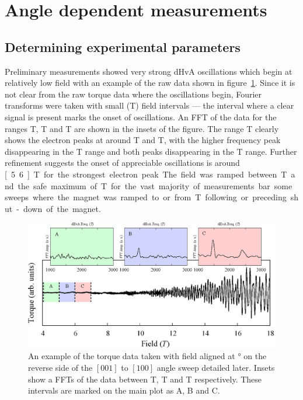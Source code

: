 
\section{Angle dependent measurements}
    \label{Sec:ResD:AngleDependentMeasurements}

\subsection{Determining experimental parameters}

Preliminary measurements showed very strong \ac{dHvA} oscillations which begin at relatively low field with an example of the raw data shown in figure~\ref{Fig:ResD:RawOscillations}. Since it is not clear from the raw torque data where the oscillations begin, Fourier transforms were taken with small (\unit[1]{T}) field intervals --- the interval where a clear signal is present marks the onset of oscillations. An \ac{FFT} of the data for the ranges \unit[4-5]{T}, \unit[5-6]{T} and \unit[6-7]{T} are shown in the insets of the figure. The range \unit[6-7]{T} clearly shows the electron peaks at around \unit[1500]{T} and \unit[2450]{T}, with the higher frequency peak disappearing in the \unit[5-6]{T} range and both peaks disappearing in the \unit[4-5]{T} range. Further refinement suggests the onset of appreciable oscillations is around \unit[5.6]{T} for the strongest electron peak. The field was ramped between \unit[6]{T} and the safe maximum of \unit[18]{T} for the vast majority of measurements bar some sweeps where the magnet was ramped to or from \unit[0]{T} following or preceding shut-down of the magnet.

\begin{figure}[htbp]
    \begin{center}
        \includegraphics[scale=0.7]{Chapter-dHvABaFe2P2/Figures/AngleDepMeasurements/RawOscillations/RawOscillations}
        \caption{An example of the torque data taken with field aligned at \unit[26]{\degree} on the reverse side of the $[001]$ to $[100]$ angle sweep detailed later. Insets show a \acp{FFT} of the data between \unit[4-5]{T}, \unit[5-6]{T} and \unit[6-7]{T} respectively. These intervals are marked on the main plot as A, B and C.}
        \label{Fig:ResD:RawOscillations}
    \end{center}
\end{figure}

